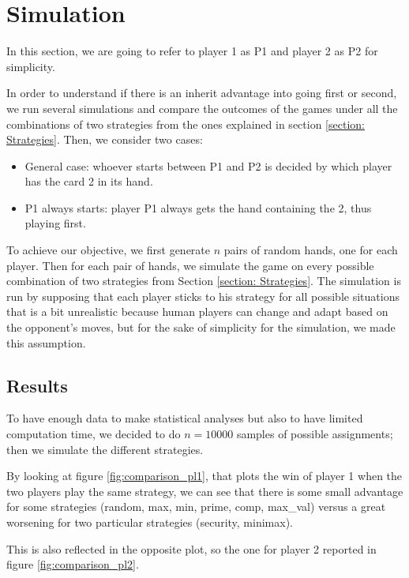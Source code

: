 \section{Simulation} \label{section:Simulation} %
In this section, we are going to refer to player 1 as P1 and player 2 as P2 for simplicity.

In order to understand if there is an inherit advantage into going first or second, we run several simulations and compare the outcomes of the games under all the combinations of two strategies from the ones explained in section \ref{section: Strategies}. Then, we consider two cases:
\begin{itemize}
    \item General case: whoever starts between P1 and P2 is decided by which player has the card 2 in its hand.
    \item P1 always starts: player P1 always gets the hand containing the 2, thus playing first.
\end{itemize}
To achieve our objective, we first generate $n$ pairs of random hands, one for each player. Then for each pair of hands, we simulate the game on every possible combination of two strategies from Section \ref{section: Strategies}. The simulation is run by supposing that each player sticks to his strategy for all possible situations that is a bit unrealistic because human players can change and adapt based on the opponent's moves, but for the sake of simplicity for the simulation, we made this assumption.

\subsection{Results} \label{subsection:Results}
To have enough data to make statistical analyses but also to have limited computation time, we decided to do $n = 10000$ samples of possible assignments; then we simulate the different strategies.

By looking at figure \ref{fig:comparison_pl1}, that plots the win of player 1 when the two players play the same strategy, we can see that there is some small advantage for some strategies (random, max, min, prime, comp, max\_val) versus a great worsening for two particular strategies (security, minimax).

This is also reflected in the opposite plot, so the one for player 2 reported in figure \ref{fig:comparison_pl2}.

